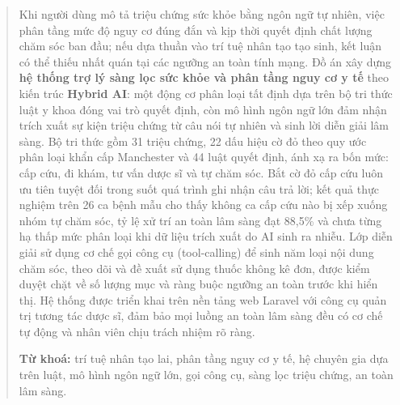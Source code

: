 \begin{abstract}

Khi người dùng mô tả triệu chứng sức khỏe bằng ngôn ngữ tự nhiên, việc phân
tầng mức độ nguy cơ đúng đắn và kịp thời quyết định chất lượng chăm sóc ban
đầu; nếu dựa thuần vào trí tuệ nhân tạo tạo sinh, kết luận có thể thiếu nhất
quán tại các ngưỡng an toàn tính mạng. Đồ án xây dựng \textbf{hệ thống trợ
lý sàng lọc sức khỏe và phân tầng nguy cơ y tế} theo kiến trúc \textbf{Hybrid
AI}: một động cơ phân loại tất định dựa trên bộ tri thức luật y khoa đóng vai
trò quyết định, còn mô hình ngôn ngữ lớn đảm nhận trích xuất sự kiện triệu
chứng từ câu nói tự nhiên và sinh lời diễn giải lâm sàng. Bộ tri thức gồm
31 triệu chứng, 22 dấu hiệu cờ đỏ theo quy ước phân loại khẩn cấp Manchester
và 44 luật quyết định, ánh xạ ra bốn mức: cấp cứu, đi khám, tư vấn dược sĩ
và tự chăm sóc. Bắt cờ đỏ cấp cứu luôn ưu tiên tuyệt đối trong suốt quá
trình ghi nhận câu trả lời; kết quả thực nghiệm trên 26 ca bệnh mẫu cho thấy
không ca cấp cứu nào bị xếp xuống nhóm tự chăm sóc, tỷ lệ xử trí an toàn lâm
sàng đạt 88,5\% và chưa từng hạ thấp mức phân loại khi dữ liệu trích xuất do
AI sinh ra nhiễu. Lớp diễn giải sử dụng cơ chế gọi
công cụ (tool-calling) để sinh năm loại nội dung chăm sóc, theo dõi và đề
xuất sử dụng thuốc không kê đơn, được kiểm duyệt chặt về số lượng mục và
ràng buộc ngưỡng an toàn trước khi hiển thị. Hệ thống được triển khai trên
nền tảng web Laravel với công cụ quản trị tương tác dược sĩ, đảm bảo mọi
luồng an toàn lâm sàng đều có cơ chế tự động và nhân viên chịu trách nhiệm
rõ ràng.

\vspace{0.8em}
\noindent\textbf{Từ khoá:} trí tuệ nhân tạo lai, phân tầng nguy cơ y tế,
hệ chuyên gia dựa trên luật, mô hình ngôn ngữ lớn, gọi công cụ, sàng lọc triệu
chứng, an toàn lâm sàng.
\end{abstract}